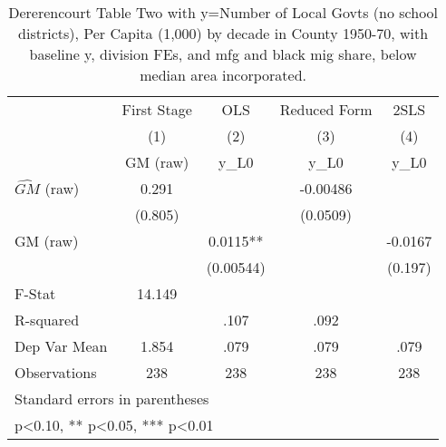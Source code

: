 \begin{table}[htbp]\centering
\def\sym#1{\ifmmode^{#1}\else\(^{#1}\)\fi}
\caption{Dererencourt Table Two with y=Number of Local Govts (no school districts), Per Capita (1,000) by decade in County 1950-70, with baseline y, division FEs, and mfg and black mig share, below median area incorporated.}
\begin{tabular}{l*{4}{c}}
\toprule
                    & First Stage   &         OLS   &Reduced Form   &        2SLS   \\
                    &\multicolumn{1}{c}{(1)}&\multicolumn{1}{c}{(2)}&\multicolumn{1}{c}{(3)}&\multicolumn{1}{c}{(4)}\\
                    &\multicolumn{1}{c}{GM  (raw)}&\multicolumn{1}{c}{y\_L0}&\multicolumn{1}{c}{y\_L0}&\multicolumn{1}{c}{y\_L0}\\
\midrule
$\hat{GM}$ (raw)    &       0.291   &               &    -0.00486   &               \\
                    &     (0.805)   &               &    (0.0509)   &               \\
\addlinespace
GM  (raw)           &               &      0.0115** &               &     -0.0167   \\
                    &               &   (0.00544)   &               &     (0.197)   \\
\midrule
F-Stat              &      14.149   &               &               &               \\
R-squared           &               &        .107   &        .092   &               \\
Dep Var Mean        &       1.854   &        .079   &        .079   &        .079   \\
Observations        &         238   &         238   &         238   &         238   \\
\bottomrule
\multicolumn{5}{l}{\footnotesize Standard errors in parentheses}\\
\multicolumn{5}{l}{\footnotesize * p<0.10, ** p<0.05, *** p<0.01}\\
\end{tabular}
\end{table}
